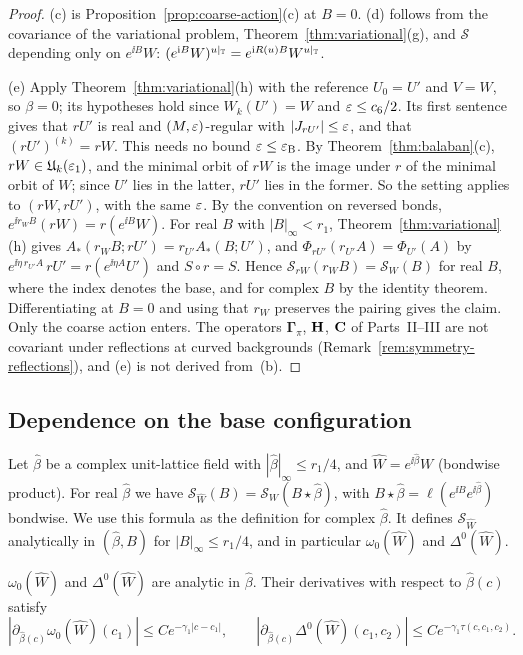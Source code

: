 \begin{proof}
(c) is Proposition~\ref{prop:coarse-action}(c) at $B=0$. (d) follows from the covariance of the variational problem, Theorem~\ref{thm:variational}(g), and $\mathcal S$ depending only on $e^{\ii B}W$: $(e^{\mathrm i B}W)^{u|_\mathbb T}=e^{\mathrm i R(u)B}W^{u|_\mathbb T}$.

(e) Apply Theorem~\ref{thm:variational}(h) with the reference $U_0=U'$ and $V=W$, so $\beta=0$; its hypotheses hold since $W_k(U')=W$ and $\varepsilon\le c_6/2$. Its first sentence gives that $rU'$ is real and $(M,\varepsilon)$-regular with $|J_{rU'}|\le\varepsilon$, and that $(rU')^{(k)}=rW$. This needs no bound $\varepsilon\le\varepsilon_{\rm B}$. By Theorem~\ref{thm:balaban}(c), $rW\in\mathfrak U_k(\varepsilon_1)$, and the minimal orbit of $rW$ is the image under $r$ of the minimal orbit of $W$; since $U'$ lies in the latter, $rU'$ lies in the former. So the setting applies to $(rW,rU')$, with the same $\varepsilon$. By the convention on reversed bonds, $e^{\ii r_WB}(rW)=r(e^{\ii B}W)$. For real $B$ with $|B|_\infty<r_1$, Theorem~\ref{thm:variational}(h) gives $A_*(r_WB;rU')=r_{U'}A_*(B;U')$, and $\Phi_{rU'}(r_{U'}A)=\Phi_{U'}(A)$ by $e^{\ii\eta\,r_{U'}A}\,rU'=r(e^{\ii\eta A}U')$ and $S\circ r=S$. Hence $\mathcal S_{rW}(r_WB)=\mathcal S_W(B)$ for real $B$, where the index denotes the base, and for complex $B$ by the identity theorem. Differentiating at $B=0$ and using that $r_W$ preserves the pairing gives the claim. Only the coarse action enters. The operators $\boldsymbol\Gamma_\pi$, $\mathbf H$, $\mathbf C$ of Parts~II--III are not covariant under reflections at curved backgrounds (Remark~\ref{rem:symmetry-reflections}), and (e) is not derived from~(b).
\end{proof}

\subsection{Dependence on the base configuration}\label{ss:33.3}

Let $\hat\beta$ be a complex unit-lattice field with $|\hat\beta|_\infty\le r_1/4$, and $\hat W=e^{\ii\hat\beta}W$ (bondwise product). For real $\hat\beta$ we have $\mathcal S_{\hat W}(B)=\mathcal S_W(B\star\hat\beta)$, with $B\star\hat\beta=\ell(e^{\ii B}e^{\ii\hat\beta})$ bondwise. We use this formula as the definition for complex $\hat\beta$. It defines $\mathcal S_{\hat W}$ analytically in $(\hat\beta,B)$ for $|B|_\infty\le r_1/4$, and in particular $\omega_0(\hat W)$ and $\Delta^0(\hat W)$.

\begin{proposition}\label{prop:base-dependence}
$\omega_0(\hat W)$ and $\Delta^0(\hat W)$ are analytic in $\hat\beta$. Their derivatives with respect to $\hat\beta(c)$ satisfy
\[
|\partial_{\hat\beta(c)}\omega_0(\hat W)(c_1)|\le Ce^{-\gamma_1|c-c_1|},\qquad|\partial_{\hat\beta(c)}\Delta^0(\hat W)(c_1,c_2)|\le Ce^{-\gamma_1\tau(c,c_1,c_2)} .
\]
\end{proposition}

